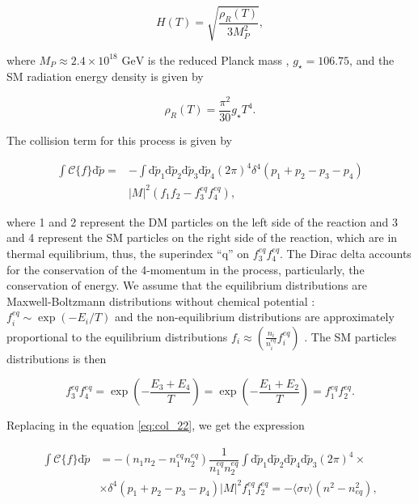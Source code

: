\documentclass[final,5p,times,twocolumn, nopreprintline]{elsarticle}
\numberwithin{equation}{section}
\begin{document}
\begin{equation}
H(T)=\sqrt{\dfrac{\rho_R(T)}{3M_P^2}}, \label{eq:hubble_rate}
\end{equation}

where $M_P\approx 2.4\times10^{18}\text{ GeV}$ is the reduced Planck mass \cite{mambrini2021particles}, $g_\star=106.75$, and the SM radiation energy density is given by

\begin{equation}
\rho_R(T)=\dfrac{\pi^2}{30}g_\star T^4. \label{eq:rad_dens}
\end{equation}

The collision term for this process is given by \cite{baumann2022cosmology}

\begin{align}
\int\mathcal{C}\{f\}\mathrm{d}\tilde{p}=&-\int\mathrm{d}\tilde{p}_1\mathrm{d}\tilde{p}_2\mathrm{d}\tilde{p}_3\mathrm{d}\tilde{p}_4(2\pi)^4\delta^4(p_1+p_2-p_3-p_4)\nonumber\\&|M|^2(f_1f_2-f_3^{eq}f_4^{eq}), \label{eq:col_22}
\end{align}

where 1 and 2 represent the DM particles on the left side of the reaction and 3 and 4 represent the SM particles on the right side of the reaction, which are in thermal equilibrium, thus, the superindex ``q'' on $f_3^{eq}f_4^{eq}$. The Dirac delta accounts for the conservation of the 4-momentum in the process, particularly, the conservation of energy. We assume that the equilibrium distributions are Maxwell-Boltzmann distributions without chemical potential \cite{kolb1991early}: $f_i^{eq}\sim \exp(-E_i/T)$ and the non-equilibrium distributions are approximately proportional to the equilibrium distributions $f_i\approx\left(\frac{n_i}{n_i^{eq}}f_i^{eq}\right)$ \citep{pierre2019dark}. The SM particles distributions is then

\begin{equation}
f_3^{eq}f_4^{eq}=\exp\left(-\dfrac{E_3+E_4}{T}\right)=\exp\left(-\dfrac{E_1+E_2}{T}\right)=f_1^{eq}f_2^{eq}. \label{eq:eq_dist_wimp}
\end{equation}

Replacing in the equation \ref{eq:col_22}, we get the expression

\begin{align}
\int\mathcal{C}\{f\}\mathrm{d}\tilde{p}&=-(n_1n_2-n_1^{eq}n_2^{eq})\dfrac{1}{n_1^{eq}n_2^{eq}}\int\mathrm{d}\tilde{p}_1\mathrm{d}\tilde{p}_2\mathrm{d}\tilde{p}_4\mathrm{d}\tilde{p}_3(2\pi)^4\times\nonumber\\&\times\delta^4(p_1+p_2-p_3-p_4)|M|^2f_1^{eq}f_2^{eq}=-\langle\sigma v\rangle(n^2-n_{eq}^2),
\end{align}
\end{document}
